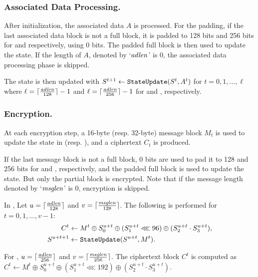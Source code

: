 \subsubsection{Associated Data Processing.}
After initialization, the associated data $A$ is processed. For the padding, if the last associated data block is not a full block,  it is padded to 128 bits and 256 bits for \MORUS[640] and \MORUS[1280] respectively, using 0 bits. The padded full block is then used to update the state. If the length of $A$, denoted by `${\it adlen}$' is 0, the associated data processing phase is skipped.

The state is then updated with $S^{t+1} \leftarrow \texttt{StateUpdate}{}(S^t, A^t)$ for $t=0,1,\ldots,\ell$ where $\ell = \lceil \frac{{\it adlen}}{128} \rceil -1$ and $\ell = \lceil \frac{{\it adlen}}{256} \rceil -1$ for \MORUS[640] and \MORUS[1280], respectively.

\subsubsection{Encryption.}
At each encryption step, a 16-byte (resp. 32-byte) message block $M_t$ is used to update the state in \MORUS[640] (resp. \MORUS[1280]), and a ciphertext $C_t$ is produced.

If the last message block is not a full block, 0 bits are used to pad it to 128 and 256 bits for \MORUS[640] and \MORUS[1280], respectively, and the padded full block is used to update the state. But only the partial block is encrypted. Note that if the message length denoted by `${\it msglen}$' is 0, encryption is skipped.

In \MORUS[640], Let $u = \lceil \frac{{\it adlen}}{128} \rceil$ and $v = \lceil \frac{{\it msglen}}{128} \rceil$. The following is performed for $t=0, 1, \ldots, v-1$:
\begin{align*}
C^t &\leftarrow M^t \oplus S^{u+t}_0 \oplus (S^{u+t}_1 \lll 96) \oplus (S^{u+t}_2 \cdot S^{u+t}_3),\\
S^{u+t+1} &\leftarrow \texttt{StateUpdate}{}(S^{u+t},M^t).
\end{align*}

For \MORUS[1280], $u = \lceil \frac{{\it adlen}}{256} \rceil$ and $v = \lceil \frac{{\it msglen}}{256} \rceil$. The ciphertext block $C^t$ is computed as $C^t \leftarrow M^t \oplus S^{u+t}_0 \oplus (S^{u+t}_1 \lll 192) \oplus (S^{u+t}_2 \cdot S^{u+t}_3)$.

